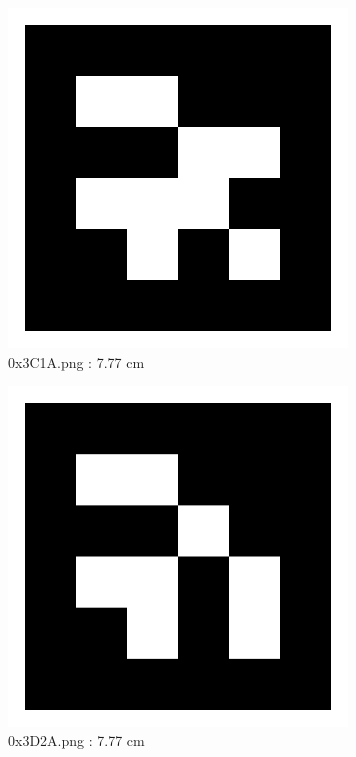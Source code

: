 \documentclass[11pt,a4,BCOR=0cm]{scrartcl}
\begin{document}
\begin{figure}
  \centering
    \includegraphics[natwidth=400,natheight=400,width=9cm]{0x3C1A.png}
    \caption{0x3C1A.png : 7.77 cm}
    \label{fig:0x3C1A.png}
  
\end{figure} 

\begin{figure}
  \centering
    \includegraphics[natwidth=400,natheight=400,width=9cm]{0x3D2A.png}
    \caption{0x3D2A.png : 7.77 cm}
    \label{fig:0x3D2A.png}
  
\end{figure} 

\clearpage
\end{document}

